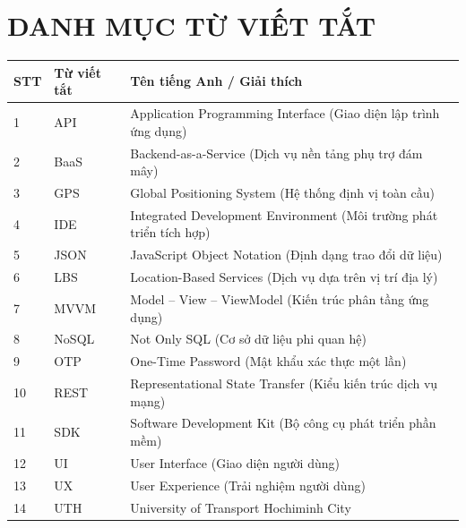 \chapter*{DANH MỤC TỪ VIẾT TẮT}

\begin{table}[H]
\centering
\renewcommand{\arraystretch}{1.2}
\begin{tabular}{|l|l|p{8.5cm}|}
\hline
\textbf{STT} & \textbf{Từ viết tắt} & \textbf{Tên tiếng Anh / Giải thích} \\ \hline
1 & API & Application Programming Interface (Giao diện lập trình ứng dụng) \\ \hline
2 & BaaS & Backend-as-a-Service (Dịch vụ nền tảng phụ trợ đám mây) \\ \hline
3 & GPS & Global Positioning System (Hệ thống định vị toàn cầu) \\ \hline
4 & IDE & Integrated Development Environment (Môi trường phát triển tích hợp) \\ \hline
5 & JSON & JavaScript Object Notation (Định dạng trao đổi dữ liệu) \\ \hline
6 & LBS & Location-Based Services (Dịch vụ dựa trên vị trí địa lý) \\ \hline
7 & MVVM & Model -- View -- ViewModel (Kiến trúc phân tầng ứng dụng) \\ \hline
8 & NoSQL & Not Only SQL (Cơ sở dữ liệu phi quan hệ) \\ \hline
9 & OTP & One-Time Password (Mật khẩu xác thực một lần) \\ \hline
10 & REST & Representational State Transfer (Kiểu kiến trúc dịch vụ mạng) \\ \hline
11 & SDK & Software Development Kit (Bộ công cụ phát triển phần mềm) \\ \hline
12 & UI & User Interface (Giao diện người dùng) \\ \hline
13 & UX & User Experience (Trải nghiệm người dùng) \\ \hline
14 & UTH & University of Transport Hochiminh City \\ \hline
\end{tabular}
\end{table}
